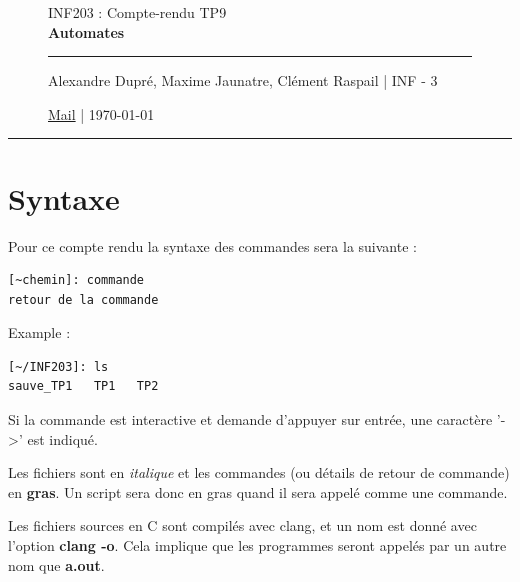 \documentclass[12pt,a4paper,notitlepage,colorinlistoftodos]{article}
\begin{document}
\begin{figure}
    \begin{minipage}{.75\textwidth}
    \begin{center}
    {\Large INF203 : Compte-rendu TP9 \\ \textbf{Automates}}
    \end{center}
    \rule{7em}{.4pt}\par
     Alexandre Dupré, Maxime Jaunatre, Clément Raspail | INF - 3 \par 
     \href{mailto:alexandre.dupre@etu.univ-grenoble-alpes.fr,maxime.jaunatre@etu.univ-grenoble-alpes.fr, clement.raspail@etu.univ-grenoble-alpes.fr}{Mail} | \today
\end{minipage}
\end{figure}

\hrule

\section*{Syntaxe}

Pour ce compte rendu la syntaxe des commandes sera la suivante :
\begin{lstlisting}
[~chemin]: commande
retour de la commande
\end{lstlisting}

Example :
\begin{lstlisting}
[~/INF203]: ls
sauve_TP1   TP1   TP2
\end{lstlisting}

Si la commande est interactive et demande d'appuyer  sur entrée, une caractère '->' est indiqué.

Les fichiers sont en \textit{italique} et les commandes (ou détails de retour de commande) en \textbf{gras}. Un script sera donc en gras quand il sera appelé comme une commande.


Les fichiers sources en C sont compilés avec clang, et un nom est donné avec l'option \textbf{clang -o}. Cela implique que les programmes seront appelés par un autre nom que \textbf{a.out}.
\end{document}
